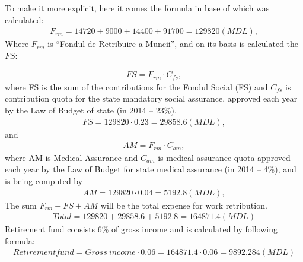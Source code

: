 To make it more explicit, here it comes the formula in base of which was calculated:
\begin{eqnarray}
F_{rm} = 14720 + 9000 + 14400 + 91700 = 129820 (MDL) , \label{PayOff}
\end{eqnarray}
Where \(F_{rm}\) is “Fondul de Retribuire a Muncii”, and on its basis is calculated the \(FS\):

\begin{eqnarray}
FS =  F_{rm} \cdot C_{fs} , \label{FondulSocial}
\end{eqnarray}
where FS is the sum of the contributions for the Fondul Social (FS) and
\(C_{fs}\) is contribution quota for the state mandatory social assurance,
approved each year by the Law of Budget of state (in 2014 – 23\%).
\begin{eqnarray}
FS = 129820 \cdot 0.23 = 29858.6 (MDL),
\end{eqnarray}
and
\begin{eqnarray}
AM = F_{rm} \cdot C_{am},
\end{eqnarray}
where AM is Medical Assurance and \(C_{am}\) is medical assurance quota approved
each year by the Law of Budget for state medical assurance (in 2014 – 4\%), and
is being computed by
\begin{eqnarray}
AM = 129820 \cdot 0.04 = 5192.8 (MDL) ,
\end{eqnarray}
The sum \(F_{rm} + FS +AM\) will be the total expense for work retribution.
\begin{eqnarray}
Total = 129820 + 29858.6 + 5192.8 = 164871.4 (MDL)
\end{eqnarray}
Retirement fund consists 6\% of gross income and is calculated by following formula:
\begin{eqnarray}
Retirement fund = Gross~ income \cdot 0.06 = 164871.4\cdot 0.06 = 9892.284 (MDL)
\end{eqnarray}

